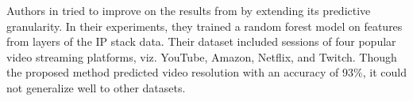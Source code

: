 

Authors in \cite{bronzino2019inferring} tried to improve on the results from \cite{mazhar2018real} by extending its predictive granularity. In their experiments, they trained a random forest model on features from layers of the IP stack data. Their dataset included sessions of four popular video streaming platforms, viz. YouTube, Amazon, Netflix, and Twitch. Though the proposed method predicted video resolution with an accuracy of 93\%, it could not generalize well to other datasets.

